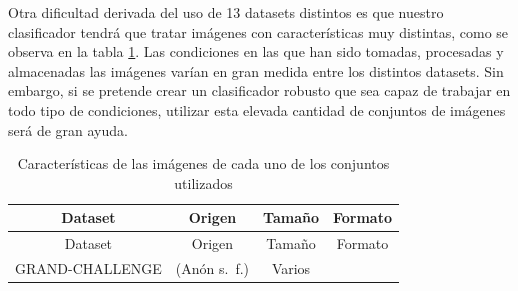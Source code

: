 \documentclass[
  12pt,
  spanish,
  a4paperpaper,
]{report}
\begin{document}
Otra dificultad derivada del uso de 13 datasets distintos es que nuestro
clasificador tendrá que tratar imágenes con características muy
distintas, como se observa en la tabla \ref{datasets2}. Las condiciones
en las que han sido tomadas, procesadas y almacenadas las imágenes
varían en gran medida entre los distintos datasets. Sin embargo, si se
pretende crear un clasificador robusto que sea capaz de trabajar en todo
tipo de condiciones, utilizar esta elevada cantidad de conjuntos de
imágenes será de gran ayuda.

\newpage

\begin{longtable}[]{@{}cccc@{}}
\caption{Características de las imágenes de cada uno de los conjuntos
utilizados \label{datasets2}}\tabularnewline
\toprule
\begin{minipage}[b]{0.33\columnwidth}\centering
Dataset\strut
\end{minipage} & \begin{minipage}[b]{0.33\columnwidth}\centering
Origen\strut
\end{minipage} & \begin{minipage}[b]{0.13\columnwidth}\centering
Tamaño\strut
\end{minipage} & \begin{minipage}[b]{0.09\columnwidth}\centering
Formato\strut
\end{minipage}\tabularnewline
\midrule
\endfirsthead
\toprule
\begin{minipage}[b]{0.33\columnwidth}\centering
Dataset\strut
\end{minipage} & \begin{minipage}[b]{0.33\columnwidth}\centering
Origen\strut
\end{minipage} & \begin{minipage}[b]{0.13\columnwidth}\centering
Tamaño\strut
\end{minipage} & \begin{minipage}[b]{0.09\columnwidth}\centering
Formato\strut
\end{minipage}\tabularnewline
\midrule
\endhead
\begin{minipage}[t]{0.33\columnwidth}\centering
GRAND-CHALLENGE\strut
\end{minipage} & \begin{minipage}[t]{0.33\columnwidth}\centering
(Anón s.~f.)\strut
\end{minipage} & \begin{minipage}[t]{0.13\columnwidth}\centering
Varios\strut
\end{minipage} & \begin{minipage}[t]{0.09\columnwidth}\centering

\end{minipage}
\end{longtable}
\end{document}
